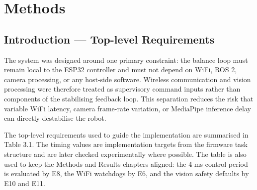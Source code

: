 \documentclass[12pt, a4paper]{article}
\begin{document}
\section{Methods}

\subsection{Introduction — Top-level Requirements}

The system was designed around one primary constraint: the balance loop must remain local to the ESP32 controller and must not depend on WiFi, ROS 2, camera processing, or any host-side software. Wireless communication and vision processing were therefore treated as supervisory command inputs rather than components of the stabilising feedback loop. This separation reduces the risk that variable WiFi latency, camera frame-rate variation, or MediaPipe inference delay can directly destabilise the robot.

The top-level requirements used to guide the implementation are summarised in Table 3.1. The timing values are implementation targets from the firmware task structure and are later checked experimentally where possible. The table is also used to keep the Methods and Results chapters aligned: the 4 ms control period is evaluated by E8, the WiFi watchdogs by E6, and the vision safety defaults by E10 and E11.
\end{document}
